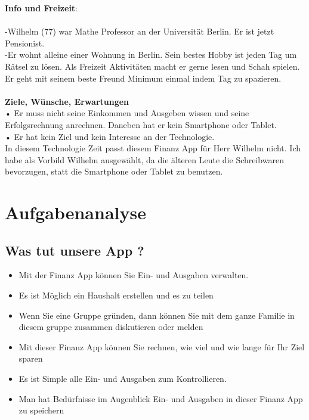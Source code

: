 \documentclass[runningheads,a4paper]{llncs}
\begin{document}
\textbf{Info und Freizeit}: \\\\
-Wilhelm (77) war Mathe Professor an der Universität Berlin. Er ist jetzt Pensionist.\\
-Er wohnt alleine einer Wohnung in Berlin. Sein bestes Hobby ist jeden Tag um Rätsel zu lösen. Als Freizeit Aktivitäten macht er gerne lesen und Schah spielen. Er geht mit seinem beste Freund Minimum einmal indem Tag zu spazieren.  \\\\



\textbf{ Ziele, Wünsche, Erwartungen}\\

• Er muss nicht seine Einkommen und Ausgeben wissen und seine Erfolgsrechnung anrechnen. Daneben hat er kein Smartphone oder Tablet.\\
• Er hat kein Ziel und kein Interesse an der Technologie.\\

In diesem Technologie Zeit passt diesem Finanz App für Herr Wilhelm nicht. Ich habe als Vorbild Wilhelm ausgewählt, da die älteren Leute die Schreibwaren bevorzugen, statt die Smartphone oder Tablet zu benutzen. 

\clearpage

\section{Aufgabenanalyse}
\subsection{Was tut unsere App ?}
\begin{itemize}
\item Mit der Finanz App können Sie Ein- und Ausgaben verwalten.
\item Es ist Möglich ein Haushalt erstellen und es zu teilen
\item Wenn Sie eine Gruppe gründen, dann können Sie mit dem ganze Familie in diesem gruppe zusammen diskutieren oder melden
\item Mit dieser Finanz App können Sie rechnen, wie viel und wie lange für Ihr Ziel sparen
\item Es ist Simple alle Ein- und Ausgaben zum Kontrollieren.
\item Man hat Bedürfnisse im Augenblick Ein- und Ausgaben in dieser Finanz App zu speichern
\end {itemize}
\end{document}
